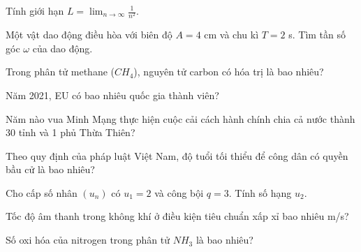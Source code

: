\begin{ex}
    Tính giới hạn $L = \lim_{n \to \infty} \frac{1}{n^2}$.
\end{ex}
\begin{ex}
    Một vật dao động điều hòa với biên độ $A = 4$ cm và chu kì $T = 2$ s. Tìm tần số góc $\omega$ của dao động.
\end{ex}
\begin{ex}
    Trong phân tử methane ($CH_4$), nguyên tử carbon có hóa trị là bao nhiêu?
\end{ex}
\begin{ex}
    Năm 2021, EU có bao nhiêu quốc gia thành viên?
\end{ex}
\begin{ex}
    Năm nào vua Minh Mạng thực hiện cuộc cải cách hành chính chia cả nước thành 30 tỉnh và 1 phủ Thừa Thiên?
\end{ex}
\begin{ex}
    Theo quy định của pháp luật Việt Nam, độ tuổi tối thiểu để công dân có quyền bầu cử là bao nhiêu?
\end{ex}
\begin{ex}
    Cho cấp số nhân $(u_n)$ có $u_1 = 2$ và công bội $q = 3$. Tính số hạng $u_2$.
\end{ex}
\begin{ex}
    Tốc độ âm thanh trong không khí ở điều kiện tiêu chuẩn xấp xỉ bao nhiêu m/s?
\end{ex}
\begin{ex}
    Số oxi hóa của nitrogen trong phân tử $NH_3$ là bao nhiêu?
\end{ex}
